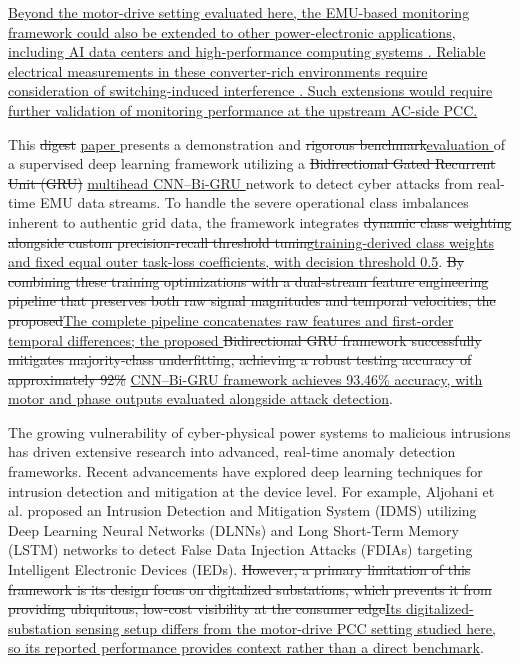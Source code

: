 \documentclass[conference,onecolumn,letterpaper]{IEEEtran} %
\providecommand{\DIFadd}[1]{{\protect\color{blue} \sf #1}} %
\providecommand{\DIFdel}[1]{{\protect\color{red} \scriptsize #1}} %
\providecommand{\DIFaddbegin}{} %
\providecommand{\DIFaddend}{} %
\providecommand{\DIFdelbegin}{} %
\providecommand{\DIFdelend}{} %
\renewcommand{\DIFadd}[1]{{\protect\color{blue}\protect\uline{#1}}}
\renewcommand{\DIFdel}[1]{{\protect\color{red}\protect\sout{#1}}}
\begin{document}
\DIFaddbegin \DIFadd{Beyond the motor-drive setting evaluated here, the EMU-based monitoring framework could also be extended to other power-electronic applications, including AI data centers and high-performance computing systems \mbox{\cite{Habibi2026DataCenters,Lotfi2026FCML}}.
Reliable electrical measurements in these converter-rich environments require consideration of switching-induced interference \mbox{\cite{Omidi2026HybridSensor}}.
Such extensions would require further validation of monitoring performance at the upstream AC-side PCC.}\DIFaddend

This \DIFdelbegin \DIFdel{digest }\DIFdelend \DIFaddbegin \DIFadd{paper }\DIFaddend presents a demonstration and \DIFdelbegin \DIFdel{rigorous benchmark}\DIFdelend \DIFaddbegin \DIFadd{evaluation }\DIFaddend  of a supervised deep learning framework utilizing a \DIFdelbegin \DIFdel{Bidirectional Gated Recurrent Unit (GRU) }\DIFdelend \DIFaddbegin \DIFadd{multihead CNN--Bi-GRU }\DIFaddend network to detect cyber attacks from real-time EMU data streams. To handle the severe operational class imbalances inherent to authentic grid data, the framework integrates \DIFdelbegin \DIFdel{dynamic class weighting alongside custom precision-recall threshold tuning}\DIFdelend \DIFaddbegin \DIFadd{training-derived class weights and fixed equal outer task-loss coefficients, with decision threshold 0.5}\DIFaddend . \DIFdelbegin \DIFdel{By combining these training optimizations with a dual-stream feature engineering pipeline that preserves both raw signal magnitudes and temporal velocities, the proposed}\DIFdelend \DIFaddbegin \DIFadd{The complete pipeline concatenates raw features and first-order temporal differences; the proposed }\DIFaddend \DIFdelbegin \DIFdel{Bidirectional GRU framework successfully mitigates majority-class underfitting, achieving a robust testing accuracy of approximately 92\% }\DIFdelend \DIFaddbegin \DIFadd{CNN--Bi-GRU framework achieves 93.46\% accuracy, with motor and phase outputs evaluated alongside attack detection}\DIFaddend .


The growing vulnerability of cyber-physical power systems to malicious intrusions has driven extensive research into advanced, real-time anomaly detection frameworks. Recent advancements have explored deep learning techniques for intrusion detection and mitigation at the device level. For example, Aljohani et al. \mbox{\cite{aljohani2024}} proposed an Intrusion Detection and Mitigation System (IDMS) utilizing Deep Learning Neural Networks (DLNNs) and Long Short-Term Memory (LSTM) networks to detect False Data Injection Attacks (FDIAs) targeting Intelligent Electronic Devices (IEDs). \DIFdelbegin \DIFdel{However, a primary limitation of this framework is its design focus on digitalized substations, which prevents it from providing ubiquitous, low-cost visibility at the consumer edge}\DIFdelend \DIFaddbegin \DIFadd{Its digitalized-substation sensing setup differs from the motor-drive PCC setting studied here, so its reported performance provides context rather than a direct benchmark}\DIFaddend .
\end{document}

